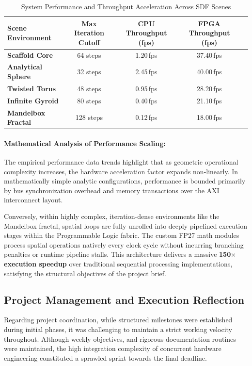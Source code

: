 \begin{table}[htbp]
\centering
\small
\renewcommand{\arraystretch}{1.2}
\caption{System Performance and Throughput Acceleration Across SDF Scenes}
\label{tab:performance_benchmarks}
\begin{tabularx}{\textwidth}{l|c|c|c|r}
\toprule
\textbf{Scene Environment} & \textbf{Max Iteration Cutoff} & \textbf{CPU Throughput (fps)} & \textbf{FPGA Throughput (fps)} \\ 
\midrule
\textbf{Scaffold Core}     & 64 steps  & 1.20\,fps  & 37.40\,fps  \\ 
\textbf{Analytical Sphere} & 32 steps  & 2.45\,fps  & 40.00\,fps  \\ 
\textbf{Twisted Torus}     & 48 steps  & 0.95\,fps  & 28.20\,fps \\ 
\textbf{Infinite Gyroid}   & 80 steps  & 0.40\,fps  & 21.10\,fps \\ 
\textbf{Mandelbox Fractal} & 128 steps & 0.12\,fps  & 18.00\,fps \\ 
\bottomrule

\end{tabularx}
\end{table}

\paragraph{Mathematical Analysis of Performance Scaling:}
The empirical performance data trends highlight that as geometric operational complexity increases, the hardware acceleration factor expands non-linearly. In mathematically simple analytic configurations, performance is bounded primarily by bus synchronization overhead and memory transactions over the AXI interconnect layout. 

Conversely, within highly complex, iteration-dense environments like the Mandelbox fractal, spatial loops are fully unrolled into deeply pipelined execution stages within the Programmable Logic fabric. The custom FP27 math modules process spatial operations natively every clock cycle without incurring branching penalties or runtime pipeline stalls. This architecture delivers a massive \textbf{150$\times$ execution speedup} over traditional sequential processing implementations, satisfying the structural objectives of the project brief.

\subsection{Project Management and Execution Reflection}
\label{sec:project_reflection}
Regarding project coordination, while structured milestones were established during initial phases, it was challenging to maintain a strict working velocity throughout. Although weekly objectives, and rigorous documentation routines were maintained, the high integration complexity of concurrent hardware engineering constituted a sprawled sprint towards the final deadline. 

